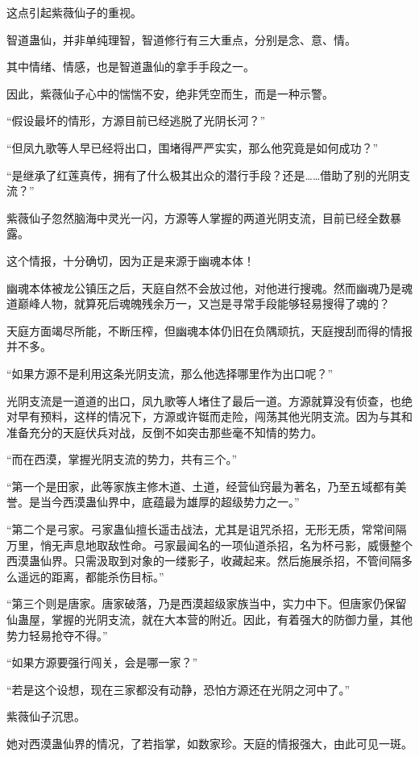 \begin{this_body}
这点引起紫薇仙子的重视。

智道蛊仙，并非单纯理智，智道修行有三大重点，分别是念、意、情。

其中情绪、情感，也是智道蛊仙的拿手手段之一。

因此，紫薇仙子心中的惴惴不安，绝非凭空而生，而是一种示警。

“假设最坏的情形，方源目前已经逃脱了光阴长河？”

“但凤九歌等人早已经将出口，围堵得严严实实，那么他究竟是如何成功？”

“是继承了红莲真传，拥有了什么极其出众的潜行手段？还是……借助了别的光阴支流？”

紫薇仙子忽然脑海中灵光一闪，方源等人掌握的两道光阴支流，目前已经全数暴露。

这个情报，十分确切，因为正是来源于幽魂本体！

幽魂本体被龙公镇压之后，天庭自然不会放过他，对他进行搜魂。然而幽魂乃是魂道巅峰人物，就算死后魂魄残余万一，又岂是寻常手段能够轻易搜得了魂的？

天庭方面竭尽所能，不断压榨，但幽魂本体仍旧在负隅顽抗，天庭搜刮而得的情报并不多。

“如果方源不是利用这条光阴支流，那么他选择哪里作为出口呢？”

光阴支流是一道道的出口，凤九歌等人堵住了最后一道。方源就算没有侦查，也绝对早有预料，这样的情况下，方源或许铤而走险，闯荡其他光阴支流。因为与其和准备充分的天庭伏兵对战，反倒不如突击那些毫不知情的势力。

“而在西漠，掌握光阴支流的势力，共有三个。”

“第一个是田家，此等家族主修木道、土道，经营仙窍最为著名，乃至五域都有美誉。是当今西漠蛊仙界中，底蕴最为雄厚的超级势力之一。”

“第二个是弓家。弓家蛊仙擅长遥击战法，尤其是诅咒杀招，无形无质，常常间隔万里，悄无声息地取敌性命。弓家最闻名的一项仙道杀招，名为杯弓影，威慑整个西漠蛊仙界。只需汲取到对象的一缕影子，收藏起来。然后施展杀招，不管间隔多么遥远的距离，都能杀伤目标。”

“第三个则是唐家。唐家破落，乃是西漠超级家族当中，实力中下。但唐家仍保留仙蛊屋，掌握的光阴支流，就在大本营的附近。因此，有着强大的防御力量，其他势力轻易抢夺不得。”

“如果方源要强行闯关，会是哪一家？”

“若是这个设想，现在三家都没有动静，恐怕方源还在光阴之河中了。”

紫薇仙子沉思。

她对西漠蛊仙界的情况，了若指掌，如数家珍。天庭的情报强大，由此可见一斑。


\end{this_body}
